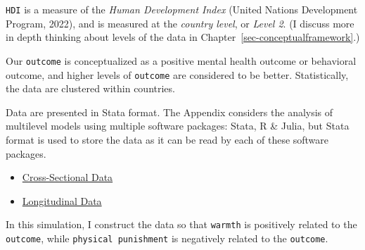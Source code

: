 \documentclass[
  letterpaper,
  DIV=11,
  numbers=noendperiod]{scrreprt}
\providecommand{\tightlist}{%
  \setlength{\itemsep}{0pt}\setlength{\parskip}{0pt}}\usepackage{longtable,booktabs,array}
\begin{document}
\texttt{HDI} is a measure of the \emph{Human Development Index} (United
Nations Development Program, 2022), and is measured at the \emph{country
level}, or \emph{Level 2}. (I discuss more in depth thinking about
levels of the data in Chapter~\ref{sec-conceptualframework}.)

Our \texttt{outcome} is conceptualized as a positive mental health
outcome or behavioral outcome, and higher levels of \texttt{outcome} are
considered to be better. Statistically, the data are clustered within
countries.

\begin{tcolorbox}[enhanced jigsaw, opacitybacktitle=0.6, opacityback=0, breakable, colframe=quarto-callout-note-color-frame, coltitle=black, toprule=.15mm, rightrule=.15mm, colback=white, bottomrule=.15mm, arc=.35mm, bottomtitle=1mm, colbacktitle=quarto-callout-note-color!10!white, titlerule=0mm, toptitle=1mm, title=\textcolor{quarto-callout-note-color}{\faInfo}\hspace{0.5em}{Download The Data}, leftrule=.75mm, left=2mm]

Data are presented in Stata format. The Appendix considers the analysis
of multilevel models using multiple software packages: Stata, R \&
Julia, but Stata format is used to store the data as it can be read by
each of these software packages.

\begin{itemize}
\tightlist
\item
  \href{https://github.com/agrogan1/multilevel-thinking/raw/main/simulate-and-analyze-multilevel-data/simulated_multilevel_data.dta}{Cross-Sectional
  Data}
\item
  \href{https://github.com/agrogan1/multilevel-thinking/raw/main/simulate-and-analyze-multilevel-data/simulated_multilevel_longitudinal_data.dta}{Longitudinal
  Data}
\end{itemize}

\end{tcolorbox}

In this simulation, I construct the data so that \texttt{warmth} is
positively related to the \texttt{outcome}, while
\texttt{physical\ punishment} is negatively related to the
\texttt{outcome}.
\end{document}

